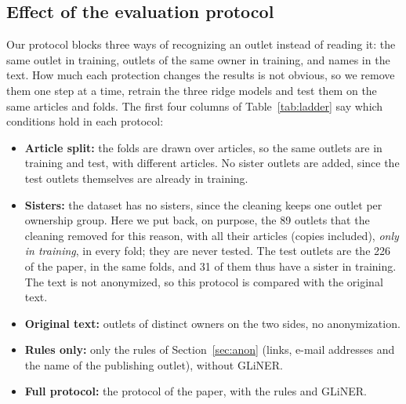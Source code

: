 \documentclass[11pt,a4paper]{article}
\begin{document}
\subsection{Effect of the evaluation protocol}\label{sec:ladder}
Our protocol blocks three ways of recognizing an outlet instead of reading it: the same outlet in training, outlets of
the same owner in training, and names in the text. How much each protection changes the results is not obvious, so we
remove them one step at a time, retrain the three ridge models and test them on the same articles and folds. The first
four columns of Table~\ref{tab:ladder} say which conditions hold in each protocol:
\begin{itemize}
  \item \textbf{Article split:} the folds are drawn over articles, so the same outlets are in training and test, with
        different articles. No sister outlets are added, since the test outlets themselves are already in training.
  \item \textbf{Sisters:} the dataset has no sisters, since the cleaning keeps one outlet per ownership group. Here we
        put back, on purpose, the 89 outlets that the cleaning removed for this reason, with all their articles
        (copies included), \emph{only in training}, in every fold; they are never tested. The test outlets are the 226
        of the paper, in the same folds, and 31 of them thus have a sister in training. The text is not anonymized,
        so this protocol is compared with the original text.
  \item \textbf{Original text:} outlets of distinct owners on the two sides, no anonymization.
  \item \textbf{Rules only:} only the rules of Section~\ref{sec:anon} (links, e-mail addresses and the name of the
        publishing outlet), without GLiNER.
  \item \textbf{Full protocol:} the protocol of the paper, with the rules and GLiNER.
\end{itemize}
\end{document}
